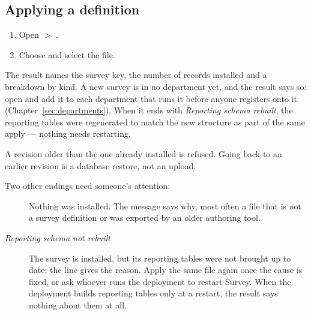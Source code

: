 \documentclass[11pt, a4paper]{article}
\begin{document}
\subsection{Applying a definition}

\begin{enumerate}
  \item Open  $>$ .
  \item Choose  and select the  file.
\end{enumerate}



The result names the survey key, the number of records installed and a breakdown by kind. A new
survey is in no department yet, and the result says so: open  and add it to each
department that runs it before anyone registers onto it (Chapter~\ref{sec:departments}). When
it ends with \emph{Reporting schema rebuilt}, the reporting tables were regenerated to match the
new structure as part of the same apply — nothing needs restarting.

\begin{elicitcaution}
A revision older than the one already installed is refused. Going back to an earlier revision is
a database restore, not an upload.
\end{elicitcaution}

Two other endings need someone's attention:

\begin{description}
  \item[] Nothing was installed. The message says why, most often a file that
        is not a survey definition or was exported by an older authoring tool.
  \item[\emph{Reporting schema not rebuilt}] The survey is installed, but its reporting tables
        were not brought up to date; the line gives the reason. Apply the same file again once
        the cause is fixed, or ask whoever runs the deployment to restart Survey. When the
        deployment builds reporting tables only at a restart, the result says nothing about
        them at all.
\end{description}
\end{document}
